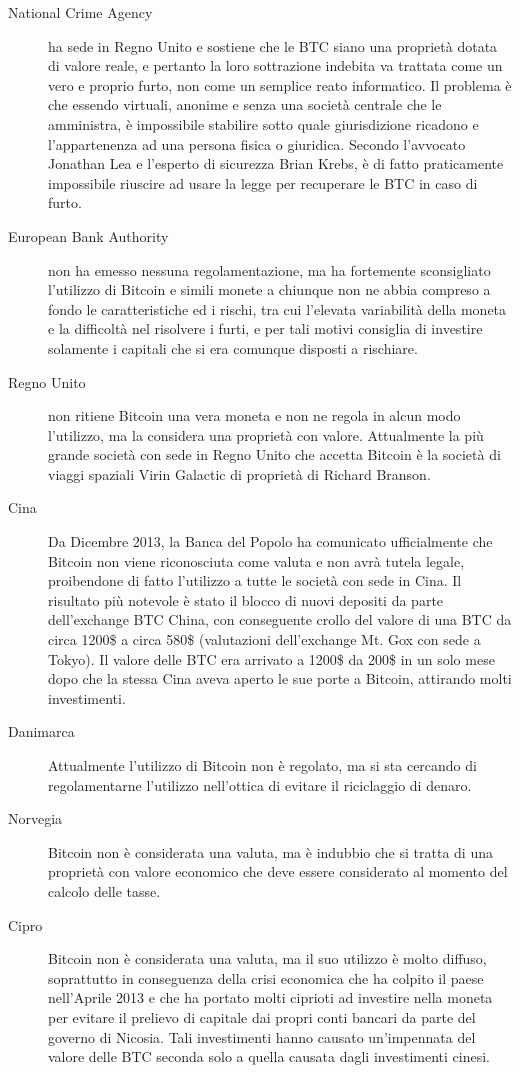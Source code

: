 \begin{description}
 \item[National Crime Agency] ha sede in Regno Unito e sostiene che le BTC siano una proprietà dotata di valore reale, e pertanto la loro sottrazione indebita va trattata come un vero e proprio furto, non come un semplice reato informatico. Il problema è che essendo virtuali, anonime e senza una società centrale che le amministra, è impossibile stabilire sotto quale giurisdizione ricadono e l'appartenenza ad una persona fisica o giuridica. Secondo l'avvocato Jonathan Lea e l'esperto di sicurezza Brian Krebs, è di fatto praticamente impossibile riuscire ad usare la legge per recuperare le BTC in caso di furto.
 \item[European Bank Authority] non ha emesso nessuna regolamentazione, ma ha fortemente sconsigliato l'utilizzo di Bitcoin e simili monete a chiunque non ne abbia compreso a fondo le caratteristiche ed i rischi, tra cui l'elevata variabilità della moneta e la difficoltà nel risolvere i furti, e per tali motivi consiglia di investire solamente i capitali che si era comunque disposti a rischiare.
 \item[Regno Unito] non ritiene Bitcoin una vera moneta e non ne regola in alcun modo l'utilizzo, ma la considera una proprietà con valore. Attualmente la più grande società con sede in Regno Unito che accetta Bitcoin è la società di viaggi spaziali Virin Galactic di proprietà di Richard Branson.
 \item[Cina] Da Dicembre 2013, la Banca del Popolo ha comunicato ufficialmente che Bitcoin non viene riconosciuta come valuta e non avrà tutela legale, proibendone di fatto l'utilizzo a tutte le società con sede in Cina. Il risultato più notevole è stato il blocco di nuovi depositi da parte dell'exchange BTC China, con conseguente crollo del valore di una BTC da circa 1200\$ a circa 580\$ (valutazioni dell'exchange Mt. Gox con sede a Tokyo). Il valore delle BTC era arrivato a 1200\$ da 200\$ in un solo mese dopo che la stessa Cina aveva aperto le sue porte a Bitcoin, attirando molti investimenti.
 \item[Danimarca] Attualmente l'utilizzo di Bitcoin non è regolato, ma si sta cercando di regolamentarne l'utilizzo nell'ottica di evitare il riciclaggio di denaro.
 \item[Norvegia] Bitcoin non è considerata una valuta, ma è indubbio che si tratta di una proprietà con valore economico che deve essere considerato al momento del calcolo delle tasse.
 \item[Cipro] Bitcoin non è considerata una valuta, ma il suo utilizzo è molto diffuso, soprattutto in conseguenza della crisi economica che ha colpito il paese nell'Aprile 2013 e che ha portato molti ciprioti ad investire nella moneta per evitare il prelievo di capitale dai propri conti bancari da parte del governo di Nicosia. Tali investimenti hanno causato un'impennata del valore delle BTC seconda solo a quella causata dagli investimenti cinesi.\\

\end{description}
